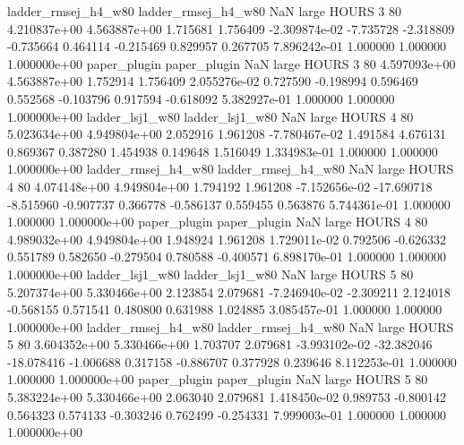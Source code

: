 ladder_rmsej_h4_w80 ladder_rmsej_h4_w80                   NaN      large    HOURS                 3 80 4.210837e+00   4.563887e+00      1.715681       1.756409 -2.309874e-02     -7.735728     -2.318809    -0.735664       0.464114 -0.215469   0.829957     0.267705   7.896242e-01            1.000000        1.000000        1.000000e+00
       paper_plugin        paper_plugin                   NaN      large    HOURS                 3 80 4.597093e+00   4.563887e+00      1.752914       1.756409  2.055276e-02      0.727590     -0.198994     0.596469       0.552568 -0.103796   0.917594    -0.618092   5.382927e-01            1.000000        1.000000        1.000000e+00
    ladder_lsj1_w80     ladder_lsj1_w80                   NaN      large    HOURS                 4 80 5.023634e+00   4.949804e+00      2.052916       1.961208 -7.780467e-02      1.491584      4.676131     0.869367       0.387280  1.454938   0.149648     1.516049   1.334983e-01            1.000000        1.000000        1.000000e+00
ladder_rmsej_h4_w80 ladder_rmsej_h4_w80                   NaN      large    HOURS                 4 80 4.074148e+00   4.949804e+00      1.794192       1.961208 -7.152656e-02    -17.690718     -8.515960    -0.907737       0.366778 -0.586137   0.559455     0.563876   5.744361e-01            1.000000        1.000000        1.000000e+00
       paper_plugin        paper_plugin                   NaN      large    HOURS                 4 80 4.989032e+00   4.949804e+00      1.948924       1.961208  1.729011e-02      0.792506     -0.626332     0.551789       0.582650 -0.279504   0.780588    -0.400571   6.898170e-01            1.000000        1.000000        1.000000e+00
    ladder_lsj1_w80     ladder_lsj1_w80                   NaN      large    HOURS                 5 80 5.207374e+00   5.330466e+00      2.123854       2.079681 -7.246940e-02     -2.309211      2.124018    -0.568155       0.571541  0.480800   0.631988     1.024885   3.085457e-01            1.000000        1.000000        1.000000e+00
ladder_rmsej_h4_w80 ladder_rmsej_h4_w80                   NaN      large    HOURS                 5 80 3.604352e+00   5.330466e+00      1.703707       2.079681 -3.993102e-02    -32.382046    -18.078416    -1.006688       0.317158 -0.886707   0.377928     0.239646   8.112253e-01            1.000000        1.000000        1.000000e+00
       paper_plugin        paper_plugin                   NaN      large    HOURS                 5 80 5.383224e+00   5.330466e+00      2.063040       2.079681  1.418450e-02      0.989753     -0.800142     0.564323       0.574133 -0.303246   0.762499    -0.254331   7.999003e-01            1.000000        1.000000        1.000000e+00
